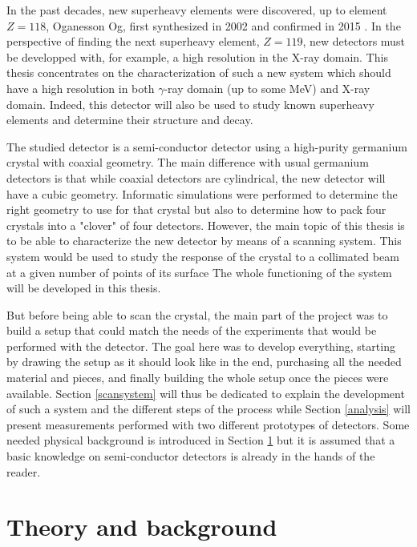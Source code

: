 \documentclass[11pt,a4paper]{article}
\begin{document}
In the past decades, new superheavy elements were discovered, up to element $Z = 118$, Oganesson Og, first synthesized in 2002 and confirmed in 2015 \cite{element118}.
In the perspective of finding the next superheavy element, $Z = 119$, new detectors must be developped with, for example, a high resolution in the X-ray domain. This thesis concentrates on the characterization of such a new system which should have a high resolution in both $\gamma$-ray domain (up to some MeV) and X-ray domain. Indeed, this detector will also be used to study known superheavy elements and determine their structure and decay.

The studied detector is a semi-conductor detector using a high-purity germanium crystal with coaxial geometry. The main difference with usual germanium detectors is that while coaxial detectors are cylindrical, the new detector will have a cubic geometry. Informatic simulations were performed to determine the right geometry to use for that crystal but also to determine how to pack four crystals into a "clover" of four detectors. However, the main topic of this thesis is to be able to characterize the new detector by means of a scanning system. This system would be used to study the response of the crystal to a collimated beam at a given number of points of its surface The whole functioning of the system will be developed in this thesis.

But before being able to scan the crystal, the main part of the project was to build a setup that could match the needs of the experiments that would be performed with the detector. The goal here was to develop everything, starting by drawing the setup as it should look like in the end, purchasing all the needed material and pieces, and finally building the whole setup once the pieces were available. Section \ref{scansystem} will thus be dedicated to explain the development of such a system and the different steps of the process while Section \ref{analysis} will present measurements performed with two different prototypes of detectors. Some needed physical background is introduced in Section \ref{theory} but it is assumed that a basic knowledge on semi-conductor detectors is already in the hands of the reader.

\newpage

\section{Theory and background} \label{theory}
\end{document}
